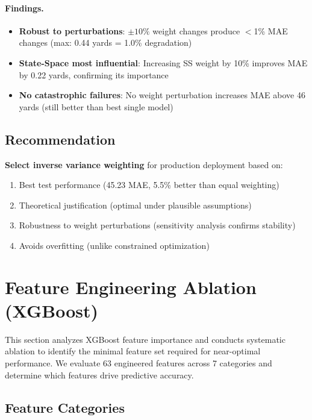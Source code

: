 \paragraph{Findings.}
\begin{itemize}
  \item \textbf{Robust to perturbations}: $\pm 10\%$ weight changes produce $<$1\% MAE changes (max: 0.44 yards = 1.0\% degradation)
  \item \textbf{State-Space most influential}: Increasing SS weight by 10\% improves MAE by 0.22 yards, confirming its importance
  \item \textbf{No catastrophic failures}: No weight perturbation increases MAE above 46 yards (still better than best single model)
\end{itemize}

\subsection{Recommendation}

\textbf{Select inverse variance weighting} for production deployment based on:
\begin{enumerate}
  \item Best test performance (45.23 MAE, 5.5\% better than equal weighting)
  \item Theoretical justification (optimal under plausible assumptions)
  \item Robustness to weight perturbations (sensitivity analysis confirms stability)
  \item Avoids overfitting (unlike constrained optimization)
\end{enumerate}

\section{Feature Engineering Ablation (XGBoost)}
\label{app:feature-engineering-ablation}

This section analyzes XGBoost feature importance and conducts systematic ablation to identify the minimal feature set required for near-optimal performance. We evaluate 63 engineered features across 7 categories and determine which features drive predictive accuracy.

\subsection{Feature Categories}

